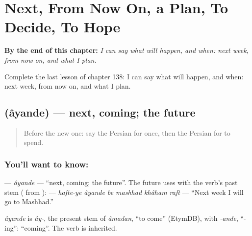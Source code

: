 
\chapter{Next, From Now On, a Plan, To Decide, To Hope}
\label{ch:fa-next-from-now-on-a-plan-to-decide-to-hope}

\begin{chapteropening}
\textbf{By the end of this chapter:} \emph{I can say what will happen, and when: next week, from now on, and what I plan.}

Complete the last lesson of chapter 138: I can say what will happen, and when: next week, from now on, and what I plan.
\end{chapteropening}

\section[\texorpdfstring{\fa{آینده} (âyande)}{آینده (âyande)}]{ (âyande) — next, coming; the future}

\label{lesson:FA-C138-ayande}



\begin{quote}
Before the new one: say the Persian for once, then the Persian for to spend.
\end{quote}

\subsection*{You'll want to know: }
\textbf{} — \emph{âyande} — \textquotedblleft{}next, coming; the future\textquotedblright{}. The future uses \textbf{} with the verb's past stem (\textbf{} from \textbf{}): \textbf{     } — \emph{hafte-ye âyande be mashhad khâham raft} — \textquotedblleft{}Next week I will go to Mashhad.\textquotedblright{}

\begin{cousinweb}
\emph{âyande} is \emph{ây-}, the present stem of \emph{âmadan}, \textquotedblleft{}to come\textquotedblright{} (EtymDB), with \emph{-ande}, \textquotedblleft{}-ing\textquotedblright{}: \textquotedblleft{}coming\textquotedblright{}. The verb is inherited.
\end{cousinweb}

